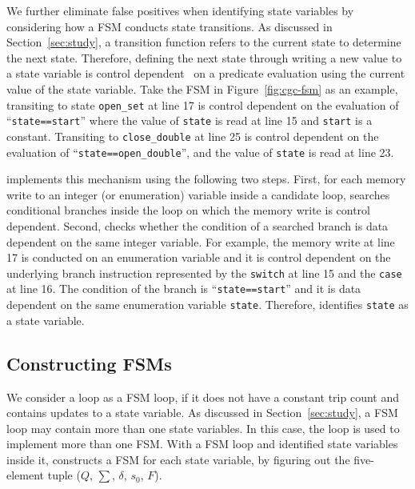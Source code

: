 We further eliminate false positives when identifying state variables 
by considering how a FSM conducts state transitions. 
As discussed in Section~\ref{sec:study}, 
a transition function refers to the current state to determine the next state. 
Therefore, defining the next state through writing a new value to a state variable 
is control dependent~\cite{cdg} on a predicate evaluation 
using the current value of the state variable.  
Take the FSM in Figure~\ref{fig:cgc-fsm} as an example, 
transiting to state \texttt{open\_set} at line 17
is control dependent on the evaluation of ``\texttt{state==start}''
where the value of \texttt{state} is read at line 15 and \texttt{start} is a constant. 
Transiting to \texttt{close\_double} at 
line 25 is control dependent on the 
evaluation of ``\texttt{state==open\_double}'', 
and the value of \texttt{state} is read at line 23.

\Tool{} implements this mechanism using the following two steps. 
First, for each memory write to an integer (or enumeration) 
variable inside a candidate loop, 
\Tool{} searches conditional branches inside the loop 
on which the memory write is control dependent. 
Second, \Tool{} checks whether the condition 
of a searched branch 
is data dependent on the same integer variable. 
For example, the memory write at line 17 is conducted on an enumeration variable
and it is control dependent on the underlying branch 
instruction represented by 
the \texttt{switch} at line 15 and the \texttt{case} at line 16.  
The condition of the branch is ``\texttt{state==start}'' and it is 
data dependent on the same enumeration variable \texttt{state}. 
Therefore, \Tool{} identifies \texttt{state} as a state variable. 


\subsection{Constructing FSMs}
\label{sec:tuple}
We consider a loop as a FSM loop, if it does not have a constant trip count 
and contains updates to a state variable.
As discussed in Section~\ref{sec:study}, 
a FSM loop may contain more than one state variables. 
In this case, the loop is used to implement more than one FSM.
With a FSM loop and identified state variables inside it, 
\Tool{} constructs a FSM for each state variable, 
by figuring out the five-element tuple 
($Q$, $\sum$, $\delta$, $s_0$, $F$). 

